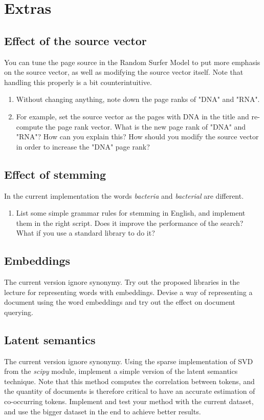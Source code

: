 \documentclass[mathserif, 11pt,c]{article}
\begin{document}
\section{Extras}

\subsection{Effect of the source vector}
You can tune the page source in the Random Surfer Model to put more emphasis on the source vector, as well as modifying the source vector itself.
Note that handling this properly is a bit counterintuitive.


\begin{enumerate}[label=\textbf{Q\thesection.\arabic*}]
	\item Without changing anything, note down the page ranks of "DNA" and "RNA".
	\item For example, set the source vector as the pages with DNA in the title and re-compute the page rank vector. What is the new page rank of "DNA" and "RNA"? How can you explain this? How should you modify the source vector in order to increase the "DNA" page rank?
\end{enumerate}

\subsection{Effect of stemming}	

In the current implementation the words \textit{bacteria} and \textit{bacterial} are different. 
\begin{enumerate}[label=\textbf{Q\thesection.\arabic*}]
	\item List some simple grammar rules for stemming in English, and implement them in the right script. Does it improve the performance of the search? What if you use a standard library to do it?
\end{enumerate}

\subsection{Embeddings}

The current version ignore synonymy. Try out the proposed libraries in the lecture for representing words with embeddings. Devise a way of representing a document using the word embeddings and try out the effect on document querying.

\subsection{Latent semantics}

The current version ignore synonymy. Using the sparse implementation of SVD from the \textit{scipy} module, implement a simple version of the latent semantics technique. Note that this method computes the correlation between tokens, and the quantity of documents is therefore critical to have an accurate estimation of co-occurring tokens. Implement and test your method with the current dataset, and use the bigger dataset in the end to achieve better results.



%
\end{document}

